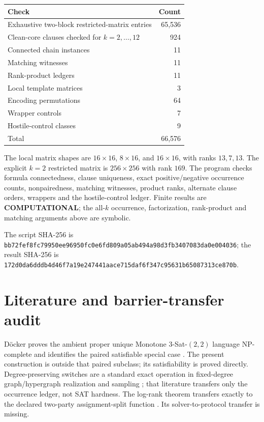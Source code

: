 \documentclass[11pt]{article}
\newcommand{\COMP}{\textbf{COMPUTATIONAL}}
\begin{document}
\begin{center}
\begin{tabular}{lr}
\toprule
Check & Count\\
\midrule
Exhaustive two-block restricted-matrix entries & 65,536\\
Clean-core clauses checked for $k=2,\ldots,12$ & 924\\
Connected chain instances & 11\\
Matching witnesses & 11\\
Rank-product ledgers & 11\\
Local template matrices & 3\\
Encoding permutations & 64\\
Wrapper controls & 7\\
Hostile-control classes & 9\\
\midrule
Total & 66,576\\
\bottomrule
\end{tabular}
\end{center}

The local matrix shapes are $16\times16$, $8\times16$, and
$16\times16$, with ranks $13,7,13$.  The explicit $k=2$ restricted matrix
is $256\times256$ with rank $169$.  The program checks formula
connectedness, clause uniqueness, exact positive/negative occurrence counts,
nonpairedness, matching witnesses, product ranks, alternate clause orders,
wrappers and the hostile-control ledger.  Finite results are \COMP; the
all-$k$ occurrence, factorization, rank-product and matching arguments above
are symbolic.

The script SHA-256 is
\nolinkurl{bb72fef8fc79950ee96950fc0e6fd809a05ab494a98d3fb3407083da0e004036};
the result SHA-256 is
\nolinkurl{172d0da6dddb4d46f7a19e247441aace715daf6f347c95631b65087313ce870b}.

\section{Literature and barrier-transfer audit}

D\"ocker proves the ambient proper unique Monotone 3-Sat-$(2,2)$ language
NP-complete and identifies the paired satisfiable special case
\cite{doecker}.  The present construction is outside that paired subclass;
its satisfiability is proved directly.  Degree-preserving switches are a
standard exact operation in fixed-degree graph/hypergraph realization and
sampling \cite{hubai}; that literature transfers only the occurrence ledger,
not SAT hardness.  The log-rank theorem transfers exactly to the declared
two-party assignment-split function \cite{mehlhorn}.  Its solver-to-protocol
transfer is missing.
\end{document}
